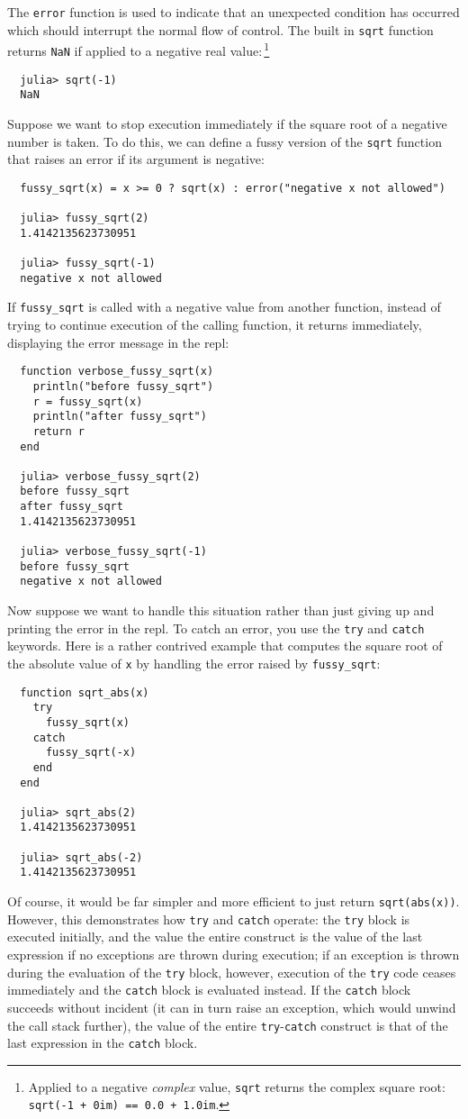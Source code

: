 \documentclass{article}
\begin{document}
The \verb|error| function is used to indicate that an unexpected condition has occurred which should interrupt the normal flow of control.
The built in \verb|sqrt| function returns \verb|NaN| if applied to a negative real value:\,\footnote{Applied to a negative \emph{complex} value, \texttt{sqrt} returns the complex square root: \texttt{sqrt(-1 + 0im) == 0.0 + 1.0im}.}
\begin{verbatim}
  julia> sqrt(-1)
  NaN
\end{verbatim}
Suppose we want to stop execution immediately if the square root of a negative number is taken.
To do this, we can define a fussy version of the \verb|sqrt| function that raises an error if its argument is negative:
\begin{verbatim}
  fussy_sqrt(x) = x >= 0 ? sqrt(x) : error("negative x not allowed")

  julia> fussy_sqrt(2)
  1.4142135623730951

  julia> fussy_sqrt(-1)
  negative x not allowed
\end{verbatim}
If \verb|fussy_sqrt| is called with a negative value from another function, instead of trying to continue execution of the calling function, it returns immediately, displaying the error message in the repl:
\begin{verbatim}
  function verbose_fussy_sqrt(x)
    println("before fussy_sqrt")
    r = fussy_sqrt(x)
    println("after fussy_sqrt")
    return r
  end

  julia> verbose_fussy_sqrt(2)
  before fussy_sqrt
  after fussy_sqrt
  1.4142135623730951

  julia> verbose_fussy_sqrt(-1)
  before fussy_sqrt
  negative x not allowed
\end{verbatim}
Now suppose we want to handle this situation rather than just giving up and printing the error in the repl.
To catch an error, you use the \verb|try| and \verb|catch| keywords.
Here is a rather contrived example that computes the square root of the absolute value of \verb|x| by handling the error raised by \verb|fussy_sqrt|:
\begin{verbatim}
  function sqrt_abs(x)
    try
      fussy_sqrt(x)
    catch
      fussy_sqrt(-x)
    end
  end

  julia> sqrt_abs(2)
  1.4142135623730951

  julia> sqrt_abs(-2)
  1.4142135623730951
\end{verbatim}
Of course, it would be far simpler and more efficient to just return \verb|sqrt(abs(x))|.
However, this demonstrates how \verb|try| and \verb|catch| operate:
the \verb|try| block is executed initially, and the value the entire construct is the value of the last expression if no exceptions are thrown during execution;
if an exception is thrown during the evaluation of the \verb|try| block, however, execution of the \verb|try| code ceases immediately and the \verb|catch| block is evaluated instead.
If the \verb|catch| block succeeds without incident (it can in turn raise an exception, which would unwind the call stack further), the value of the entire \verb|try|-\verb|catch| construct is that of the last expression in the \verb|catch| block.
\end{document}
